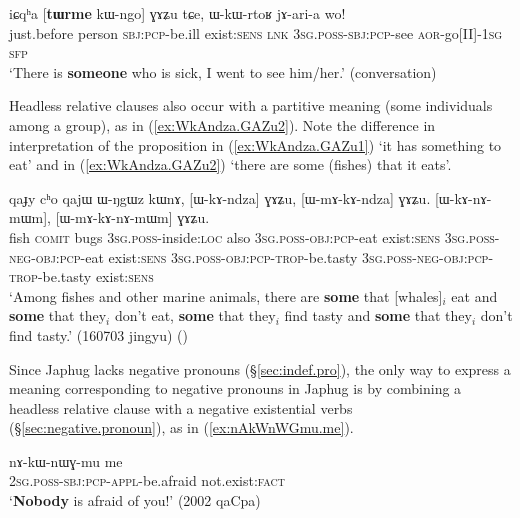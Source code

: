 \begin{exe}
\ex \label{ex:tWrme.kWngo.GAZu}
\gll  iɕqʰa [\textbf{tɯrme} kɯ-ngo] ɣɤʑu tɕe, ɯ-kɯ-rtoʁ jɤ-ari-a wo! \\
just.before person \textsc{sbj}:\textsc{pcp}-be.ill exist:\textsc{sens} \textsc{lnk} \textsc{3sg}.\textsc{poss}-\textsc{sbj}:\textsc{pcp}-see \textsc{aor}-go[II]-\textsc{1sg} \textsc{sfp} \\
\glt `There is \textbf{someone} who is sick, I went to see him/her.' (conversation)
\end{exe}

Headless relative clauses also occur with a partitive meaning (some individuals among a group), as in (\ref{ex:WkAndza.GAZu2}). Note the difference in interpretation of the proposition  in (\ref{ex:WkAndza.GAZu1}) `it has something to eat' and in (\ref{ex:WkAndza.GAZu2}) `there are some (fishes) that it eats'.

\begin{exe}
\ex \label{ex:WkAndza.GAZu2}
\gll qaɟy cʰo qajɯ ɯ-ŋgɯz kɯnɤ, [ɯ-kɤ-ndza] ɣɤʑu, [ɯ-mɤ-kɤ-ndza] ɣɤʑu. [ɯ-kɤ-nɤ-mɯm], [ɯ-mɤ-kɤ-nɤ-mɯm] ɣɤʑu. \\
fish \textsc{comit} bugs \textsc{3sg}.\textsc{poss}-inside:\textsc{loc} also \textsc{3sg}.\textsc{poss}-\textsc{obj}:\textsc{pcp}-eat exist:\textsc{sens}  \textsc{3sg}.\textsc{poss}-\textsc{neg}-\textsc{obj}:\textsc{pcp}-eat exist:\textsc{sens} \textsc{3sg}.\textsc{poss}-\textsc{obj}:\textsc{pcp}-\textsc{trop}-be.tasty \textsc{3sg}.\textsc{poss}-\textsc{neg}-\textsc{obj}:\textsc{pcp}-\textsc{trop}-be.tasty exist:\textsc{sens}  \\
\glt `Among fishes and other marine animals, there are \textbf{some} that [whales]$_i$ eat and \textbf{some} that they$_i$ don't eat, \textbf{some} that they$_i$ find tasty and \textbf{some} that they$_i$ don't find tasty.' (160703 jingyu)
()
\end{exe}

Since Japhug lacks negative pronouns (§\ref{sec:indef.pro}), the only way to express a meaning corresponding to negative pronouns in Japhug is by combining a headless relative clause with a negative existential verbs (§\ref{sec:negative.pronoun}), as in (\ref{ex:nAkWnWGmu.me}).

\begin{exe}
\ex \label{ex:nAkWnWGmu.me}
\gll nɤ-kɯ-nɯɣ-mu me \\
\textsc{2sg}.\textsc{poss}-\textsc{sbj}:\textsc{pcp}-\textsc{appl}-be.afraid not.exist:\textsc{fact} \\
\glt `\textbf{Nobody} is afraid of you!' (2002 qaCpa)
\end{exe}


